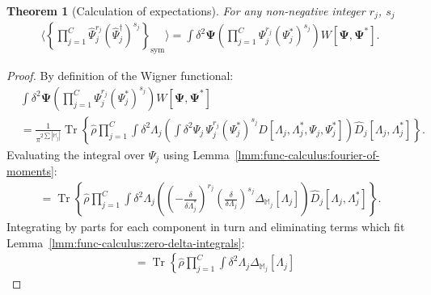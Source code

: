 \documentclass[12pt,aip,jmp,amssymb,amsmath]{revtex4-1}
\newtheorem{theorem}{Theorem}
\begin{document}
\begin{theorem}[Calculation of expectations]
\label{thm:func-wigner:moments}
    For any non-negative integer $r_j$, $s_j$
    \begin{equation*}\begin{split}
        \langle \left\{ \prod_{j=1}^C \hat{\Psi}_j^{r_j} (\hat{\Psi}_j^\dagger)^{s_j} \right\}_{\mathrm{sym}} \rangle
        = \int \delta^2 \boldsymbol{\Psi}
            \left( \prod_{j=1}^C \Psi_j^{r_j} (\Psi_j^*)^{s_j} \right) W[\boldsymbol{\Psi}, \boldsymbol{\Psi}^*].
    \end{split}\end{equation*}
\end{theorem}
\begin{proof}
By definition of the Wigner functional:
\begin{equation}\begin{split}
    & \int \delta^2\boldsymbol{\Psi} \left( \prod_{j=1}^C \Psi_j^{r_j} (\Psi_j^*)^{s_j} \right) W[\boldsymbol{\Psi}, \boldsymbol{\Psi}^*] \\
    & = \frac{1}{\pi^{2\sum|\mathbb{M}_j|}} \operatorname{Tr} \left\{ \hat{\rho}
        \prod_{j=1}^C
            \int \delta^2 \Lambda_j \left(
                \int \delta^2 \Psi_j\, \Psi_j^{r_j} (\Psi_j^*)^{s_j}
                D[\Lambda_j, \Lambda_j^*, \Psi_j, \Psi_j^*]
            \right)
            \hat{D}_j[\Lambda_j, \Lambda_j^*]
    \right\}.
\end{split}\end{equation}
Evaluating the integral over $\Psi_j$ using Lemma~\ref{lmm:func-calculus:fourier-of-moments}:
\begin{equation}\begin{split}
    = \operatorname{Tr} \left\{ \hat{\rho}
        \prod_{j=1}^C
            \int \delta^2 \Lambda_j \left(
                \left( -\frac{\delta}{\delta \Lambda_j^*} \right)^{r_j}
                \left( \frac{\delta}{\delta \Lambda_j} \right)^{s_j}
                \Delta_{\mathbb{M}_j}[\Lambda_j]
            \right)
            \hat{D}_j[\Lambda_j, \Lambda_j^*]
    \right\}.
\end{split}\end{equation}
Integrating by parts for each component in turn and eliminating terms which fit Lemma~\ref{lmm:func-calculus:zero-delta-integrals}:
\begin{equation}\begin{split}
    & = \operatorname{Tr} \left\{ \hat{\rho}
        \prod_{j=1}^C \int \delta^2 \Lambda_j
            \Delta_{\mathbb{M}_j}[\Lambda_j]

\end{split}
\end{equation}
\end{proof}
\end{document}
